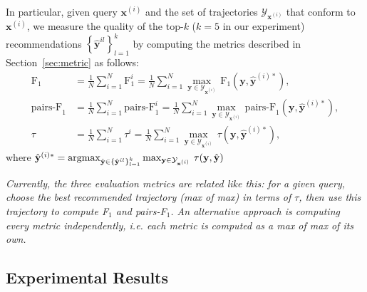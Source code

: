 In particular, given query $\mathbf{x}^{(i)}$ and the set of trajectories $\mathcal{Y}_{\mathbf{x}^{(i)}}$ that conform to $\mathbf{x}^{(i)}$,
we measure the quality of the top-$k$ ($k=5$ in our experiment) recommendations $\left\{\hat{\mathbf{y}}^{il}\right\}_{l=1}^{k}$ 
by computing the metrics described in Section~\ref{sec:metric} as follows:
\begin{align*}
\text{F}_1 
&= \frac{1}{N} \sum_{i=1}^N \text{F}_1^i 
 = \frac{1}{N} \sum_{i=1}^N \max_{\mathbf{y} \in \mathcal{Y}_{\mathbf{x}^{(i)}}} \, \text{F}_1(\mathbf{y}, \hat{\mathbf{y}}^{(i)*}), \\
\text{pairs-F}_1 
&= \frac{1}{N} \sum_{i=1}^N \text{pairs-F}_1^i 
 = \frac{1}{N} \sum_{i=1}^N \max_{\mathbf{y} \in \mathcal{Y}_{\mathbf{x}^{(i)}}} \, \text{pairs-F}_1(\mathbf{y}, \hat{\mathbf{y}}^{(i)*}), \\
\tau 
&= \frac{1}{N} \sum_{i=1}^N \tau^i 
 = \frac{1}{N} \sum_{i=1}^N \max_{\mathbf{y} \in \mathcal{Y}_{\mathbf{x}^{(i)}}} \, \tau(\mathbf{y}, \hat{\mathbf{y}}^{(i)*}),
\end{align*}
where 
$\hat{\mathbf{y}}^{(i)*} = \operatorname*{argmax}_{\hat{\mathbf{y}} \in \left\{\hat{\mathbf{y}}^{il}\right\}_{l=1}^{k}} 
 \max_{\mathbf{y} \in \mathcal{Y}_{\mathbf{x}^{(i)}}} \, \tau(\mathbf{y}, \hat{\mathbf{y}})$

{\it Currently, the three evaluation metrics are related like this: 
for a given query, choose the best recommended trajectory (max of max) in terms of $\tau$,
then use this trajectory to compute F$_1$ and pairs-F$_1$. 
An alternative approach is computing every metric independently, i.e. each metric is computed as a max of max of its own.}


\subsection{Experimental Results}
\label{sec:result}
